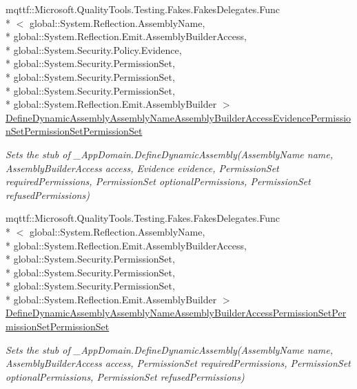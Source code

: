 \begin{DoxyCompactItemize}
mqttf\-::\-Microsoft.\-Quality\-Tools.\-Testing.\-Fakes.\-Fakes\-Delegates.\-Func\\*
$<$ global\-::\-System.\-Reflection.\-Assembly\-Name, \\*
global\-::\-System.\-Reflection.\-Emit.\-Assembly\-Builder\-Access, \\*
global\-::\-System.\-Security.\-Policy.\-Evidence, \\*
global\-::\-System.\-Security.\-Permission\-Set, \\*
global\-::\-System.\-Security.\-Permission\-Set, \\*
global\-::\-System.\-Security.\-Permission\-Set, \\*
global\-::\-System.\-Reflection.\-Emit.\-Assembly\-Builder $>$ \hyperlink{class_system_1_1_fakes_1_1_stub___app_domain_af19119395afcaaf1e46afb58460e968e}{Define\-Dynamic\-Assembly\-Assembly\-Name\-Assembly\-Builder\-Access\-Evidence\-Permission\-Set\-Permission\-Set\-Permission\-Set}
\begin{DoxyCompactList}\small\item\em Sets the stub of \-\_\-\-App\-Domain.\-Define\-Dynamic\-Assembly(\-Assembly\-Name name, Assembly\-Builder\-Access access, Evidence evidence, Permission\-Set required\-Permissions, Permission\-Set optional\-Permissions, Permission\-Set refused\-Permissions)\end{DoxyCompactList}\item 
mqttf\-::\-Microsoft.\-Quality\-Tools.\-Testing.\-Fakes.\-Fakes\-Delegates.\-Func\\*
$<$ global\-::\-System.\-Reflection.\-Assembly\-Name, \\*
global\-::\-System.\-Reflection.\-Emit.\-Assembly\-Builder\-Access, \\*
global\-::\-System.\-Security.\-Permission\-Set, \\*
global\-::\-System.\-Security.\-Permission\-Set, \\*
global\-::\-System.\-Security.\-Permission\-Set, \\*
global\-::\-System.\-Reflection.\-Emit.\-Assembly\-Builder $>$ \hyperlink{class_system_1_1_fakes_1_1_stub___app_domain_a43ba2c254f8dd038ee09af9c63c5da2a}{Define\-Dynamic\-Assembly\-Assembly\-Name\-Assembly\-Builder\-Access\-Permission\-Set\-Permission\-Set\-Permission\-Set}
\begin{DoxyCompactList}\small\item\em Sets the stub of \-\_\-\-App\-Domain.\-Define\-Dynamic\-Assembly(\-Assembly\-Name name, Assembly\-Builder\-Access access, Permission\-Set required\-Permissions, Permission\-Set optional\-Permissions, Permission\-Set refused\-Permissions)\end{DoxyCompactList}\item 

\end{DoxyCompactItemize}
